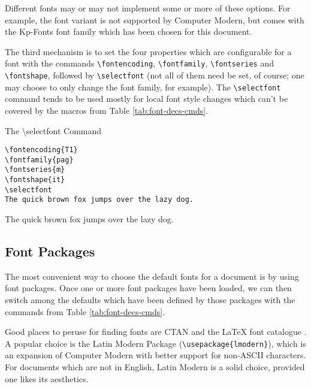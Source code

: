 \documentclass[a4paper,oneside,11pt]{article}
\begin{document}
Different fonts  may or may not  implement some or more  of these options. For
example, the    font variant is not  supported by
Computer Modern, but comes with the Kp-Fonts font family which has been chosen
for this document.

The  third mechanism  is to  set the  four properties  which are  configurable
for  a  font  with   the  commands  \verb|\fontencoding|,  \verb|\fontfamily|,
\verb|\fontseries| and \verb|\fontshape|,  followed by \verb|\selectfont| (not
all of  them need be set,  of course; one may  choose to only change  the font
family, for example). The  \verb|\selectfont| command tends to  be used mostly
for local font style  changes which can't be covered by  the macros from Table
\ref{tab:font-decs-cmds}.


\begin{titled-frame}
{\textsf{The \textbackslash{}selectfont Command}}
\vspace{-1em}
\begin{verbatim}
\fontencoding{T1}
\fontfamily{pag}
\fontseries{m}
\fontshape{it}
\selectfont
The quick brown fox jumps over the lazy dog.
\end{verbatim}
\selectfont
The quick brown fox jumps over the lazy dog.
\end{titled-frame}


\subsection{Font Packages}
\label{subsec:font-packages}

The most convenient way to choose the default fonts for a document is by using
font packages. Once  one or more font  packages have been loaded,  we can then
switch among the  defaults which have been defined by  those packages with the
commands from Table \ref{tab:font-decs-cmds}.

Good places  to peruse for  finding fonts  are CTAN \cite{ctan:fonts}  and the
\LaTeX{}  font  catalogue  \cite{tug:font-catalog}. A popular  choice  is  the
Latin Modern  Package (\verb|\usepackage{lmodern}|), which is  an expansion of
Computer Modern  with better  support for non-ASCII  characters. For documents
which are not in  English, Latin Modern is a solid  choice, provided one likes
its aesthetics.
\end{document}
